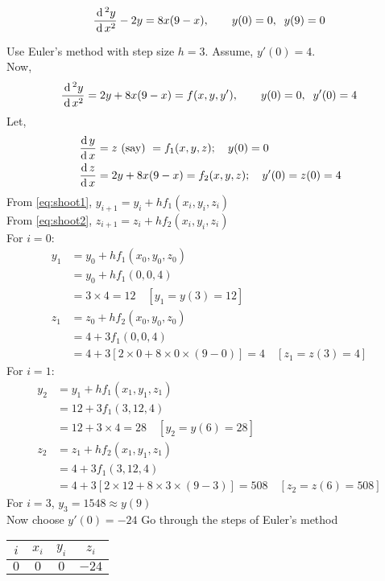 \documentclass[../main-sheet.tex]{subfiles}
\begin{document}
\begin{ex}
    \[\frac{\,\mathrm{d}\,^2 y}{\,\mathrm{d}\, x^2}-2y=8x(9-x),\qquad y(0)=0,\;\;y(9)=0\]
\end{ex}
\begin{soln}
    Use Euler's method with step size \(h=3\). Assume, \(y'(0)=4\).\\
    Now, 
    \[\frac{\,\mathrm{d}\,^2 y}{\,\mathrm{d}\, x^2}=2y+8x(9-x)=f(x,y,y'),\qquad y(0)=0,\;\;y'(0)=4\]
    Let,
    \begin{align}
        \,\frac{\mathrm{d}\,y}{\mathrm{d}\,x}&=z\text{ (say) }=f_1(x,y,z);\quad y(0)=0\label{eq:shoot1}\\
        \,\frac{\mathrm{d}\,z}{\mathrm{d}\,x}&=2y+8x(9-x)=f_2(x,y,z);\quad y'(0)=z(0)=4\label{eq:shoot2}\\
    \end{align}
    From \eqref{eq:shoot1}, \(y_{i+1}=y_i+hf_1(x_i,y_i,z_i)\)\\
    From \eqref{eq:shoot2}, \(z_{i+1}=z_i+hf_2(x_i,y_i,z_i)\)\\
    For \(i=0\):
    \begin{align*}
        y_1&=y_0+hf_1(x_0,y_0,z_0)\\
        &=y_0+hf_1(0,0,4)\\
        &=3\times 4=12 \quad[y_1=y(3)=12]\\
        z_1&=z_0+hf_2(x_0,y_0,z_0)\\
        &=4+3f_1(0,0,4)\\
        &=4+3[2\times 0+8\times0\times(9-0)]=4 \quad[z_1=z(3)=4]
    \end{align*}
    For \(i=1\):
    \begin{align*}
        y_2&=y_1+hf_1(x_1,y_1,z_1)\\
        &=12+3f_1(3,12,4)\\
        &=12+3\times 4=28 \quad[y_2=y(6)=28]\\
        z_2&=z_1+hf_2(x_1,y_1,z_1)\\
        &=4+3f_1(3,12,4)\\
        &=4+3[2\times 12+8\times3\times(9-3)]=508 \quad[z_2=z(6)=508]
    \end{align*}
    For \(i=3\), \(y_3=1548\approx y(9)\)\\
    Now choose \(y'(0)=-24\)
    Go through the steps of Euler's method
    \begin{table}[H]
        \centering
        \begin{tabular}{cccc}
            \toprule
            \(i\) & \(x_i\) & \(y_i\) &\(z_i\)\\\midrule
            \(0\) & \(0\) & \(0\) &\(-24\)\\

\end{tabular}
\end{table}
\end{soln}
\end{document}
